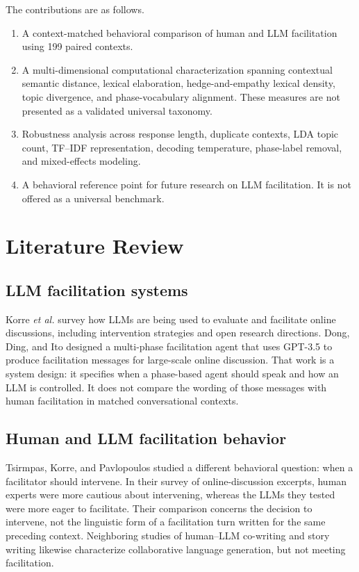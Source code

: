 \documentclass[11pt]{article}
\begin{document}
The contributions are as follows.
\begin{enumerate}
\item A context-matched behavioral comparison of human and LLM facilitation using 199 paired contexts.
\item A multi-dimensional computational characterization spanning contextual semantic distance, lexical elaboration, hedge-and-empathy lexical density, topic divergence, and phase-vocabulary alignment. These measures are not presented as a validated universal taxonomy.
\item Robustness analysis across response length, duplicate contexts, LDA topic count, TF--IDF representation, decoding temperature, phase-label removal, and mixed-effects modeling.
\item A behavioral reference point for future research on LLM facilitation. It is not offered as a universal benchmark.
\end{enumerate}

\section{Literature Review}
\subsection{LLM facilitation systems}
Korre \emph{et al.} \citep{korre2025} survey how LLMs are being used to evaluate and facilitate online discussions, including intervention strategies and open research directions. Dong, Ding, and Ito \citep{dong2024facilitation} designed a multi-phase facilitation agent that uses GPT-3.5 to produce facilitation messages for large-scale online discussion. That work is a system design: it specifies when a phase-based agent should speak and how an LLM is controlled. It does not compare the wording of those messages with human facilitation in matched conversational contexts.

\subsection{Human and LLM facilitation behavior}
Tsirmpas, Korre, and Pavlopoulos \citep{tsirmpas2026facilitate} studied a different behavioral question: when a facilitator should intervene. In their survey of online-discussion excerpts, human experts were more cautious about intervening, whereas the LLMs they tested were more eager to facilitate. Their comparison concerns the decision to intervene, not the linguistic form of a facilitation turn written for the same preceding context. Neighboring studies of human--LLM co-writing \citep{lee2022} and story writing \citep{yuan2022} likewise characterize collaborative language generation, but not meeting facilitation.
\end{document}
